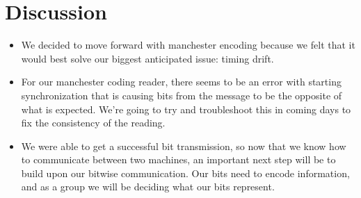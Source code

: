 \documentclass{article}
\begin{document}
\section*{Discussion}
\begin{itemize}
\item We decided to move forward with manchester encoding because we felt that it would best solve our biggest anticipated issue: timing drift.
\item For our manchester coding reader, there seems to be an error with starting synchronization that is causing bits from the message to be the opposite of what is expected.
We're going to try and troubleshoot this in coming days to fix the consistency of the reading.
\item We were able to get a successful bit transmission, so now that we know how to communicate between two machines, an important
next step will be to build upon our bitwise communication. Our bits need to encode information, and as a group we will be deciding 
what our bits represent.
\end{itemize}

\end{document}
